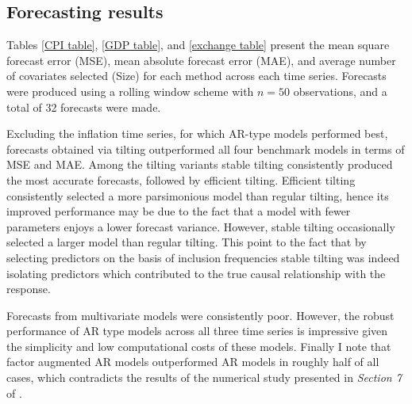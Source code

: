 \documentclass[11pt]{report}\usepackage[utf8]{inputenc}
\begin{document}
\subsection{Forecasting results}

Tables \ref{CPI table}, \ref{GDP table}, and \ref{exchange table} present the mean square forecast error (MSE), mean absolute forecast error (MAE), and average number of covariates selected (Size) for each method across each time series. Forecasts were produced using a rolling window scheme with $n = 50$ observations, and a total of 32 forecasts were made.  

Excluding the inflation time series, for which AR-type models performed best, forecasts obtained via tilting outperformed all four benchmark models in terms of MSE and MAE. Among the tilting variants stable tilting consistently produced the most accurate forecasts, followed by efficient tilting. Efficient tilting consistently selected a more parsimonious model than regular tilting, hence its improved performance may be due to the fact that a model with fewer parameters enjoys a lower forecast variance. However, stable tilting occasionally selected a larger model than regular tilting. This point to the fact that by selecting predictors on the basis of inclusion frequencies stable tilting was indeed isolating predictors which contributed to the true causal relationship with the response. 

Forecasts from multivariate models were consistently poor. However, the robust performance of AR type models across all three time series is impressive given the simplicity and low computational costs of these models.  Finally I note that factor augmented AR models outperformed AR models in roughly half of all cases, which contradicts the results of the numerical study presented in \textit{Section 7} of \cite{yousuf2018variable}.
\end{document}
